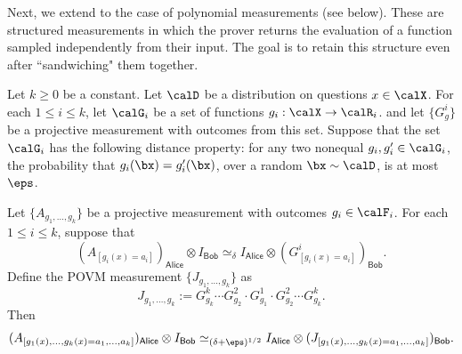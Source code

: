 \documentclass[11pt]{article}
\newcommand{\reg}[1]{{\mathsf{#1}}}
\begin{document}
Next, we extend  to the case of polynomial measurements (see  below).
These are structured measurements in which the prover returns the evaluation of a function sampled independently from their input.
The goal is to retain this structure even after ``sandwiching" them together.

\begin{fact}\label{fact:low-degree-sandwich}
Let $k \geq 0$ be a constant.
Let $\calD$ be a distribution on questions $x \in \calX$.
For each $1 \leq i \leq k$, let $\calG_i$ be a set of functions $g_i : \calX \rightarrow \calR_i$.
and let $\{G^i_g\}$ be a projective measurement with outcomes from this set.
Suppose that the set $\calG_i$ has the following distance property:
for any two nonequal $g_i, g_i' \in \calG_i$, the probability that $g_i(\bx) = g_i'(\bx)$, over a random $\bx \sim \calD$, is at most $\eps$.

Let $\{A_{g_1, \ldots, g_k}\}$ be a projective measurement with outcomes $g_i \in \calF_i$.
For each $1 \leq i \leq k$, suppose that
\begin{equation}\label{eq:treat-yo-self}
(A_{[g_i(x) = a_i]})_{\reg{Alice}} \otimes I_{\reg{Bob}} \simeq_{\delta} I_{\reg{Alice}} \otimes (G^i_{[g_i(x)=a_i]})_{\reg{Bob}}.
\end{equation}
Define the POVM measurement $\{J_{g_1, \ldots, g_k}\}$ as
\begin{equation*}
J_{g_1, \ldots, g_k} := G^k_{g_k} \cdots G^2_{g_2} \cdot G^1_{g_1} \cdot G^2_{g_2} \cdots G^k_{g_k}.
\end{equation*}
Then
\begin{equation*}
(A_{[g_1(x), \ldots, g_k(x) = a_1, \ldots, a_k]})_{\reg{Alice}} \otimes I_{\reg{Bob}} \simeq_{(\delta+\eps)^{1/2}} I_{\reg{Alice}} \otimes (J_{[g_1(x), \ldots, g_k(x) = a_1, \ldots, a_k]})_{\reg{Bob}}.
\end{equation*}
\end{fact}
\end{document}
